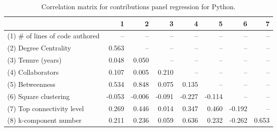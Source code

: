 \begin{table}[H]
\caption{Correlation matrix for contributions panel regression for Python.}
\label{corr_table_panel}
\begin{center}
\begin{tabular}{lrrrrrrr}
\toprule
{} &      1 &      2 &      3 &      4 &      5 &      6 &     7 \\
\midrule
(1) \# of lines of code authored &    -- &    -- &    -- &    -- &    -- &    -- &   -- \\
(2) Degree Centrality           &  0.563 &    -- &    -- &    -- &    -- &    -- &   -- \\
(3) Tenure (years)              &  0.048 &  0.050 &    -- &    -- &    -- &    -- &   -- \\
(4) Collaborators               &  0.107 &  0.005 &  0.210 &    -- &    -- &    -- &   -- \\
(5) Betweenness                 &  0.534 &  0.848 &  0.075 &  0.135 &    -- &    -- &   -- \\
(6) Square clustering           & -0.053 & -0.006 & -0.091 & -0.227 & -0.114 &    -- &   -- \\
(7) Top connectivity level      &  0.269 &  0.446 &  0.014 &  0.347 &  0.460 & -0.192 &   -- \\
(8) k-component number          &  0.211 &  0.236 &  0.059 &  0.636 &  0.232 & -0.262 & 0.653 \\
\bottomrule
\end{tabular}
\end{center} 
\end{table}

